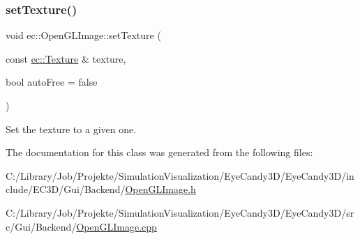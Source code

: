 \subsubsection{\texorpdfstring{set\+Texture()}{setTexture()}}
{\footnotesize\ttfamily void ec\+::\+Open\+G\+L\+Image\+::set\+Texture (\begin{DoxyParamCaption}\item[{const \mbox{\hyperlink{classec_1_1_texture}{ec\+::\+Texture}} \&}]{texture,  }\item[{bool}]{auto\+Free = {\ttfamily false} }\end{DoxyParamCaption})}

Set the texture to a given one. 

The documentation for this class was generated from the following files\+:\begin{DoxyCompactItemize}
\item 
C\+:/\+Library/\+Job/\+Projekte/\+Simulation\+Visualization/\+Eye\+Candy3\+D/\+Eye\+Candy3\+D/include/\+E\+C3\+D/\+Gui/\+Backend/\mbox{\hyperlink{_open_g_l_image_8h}{Open\+G\+L\+Image.\+h}}\item 
C\+:/\+Library/\+Job/\+Projekte/\+Simulation\+Visualization/\+Eye\+Candy3\+D/\+Eye\+Candy3\+D/src/\+Gui/\+Backend/\mbox{\hyperlink{_open_g_l_image_8cpp}{Open\+G\+L\+Image.\+cpp}}\end{DoxyCompactItemize}
